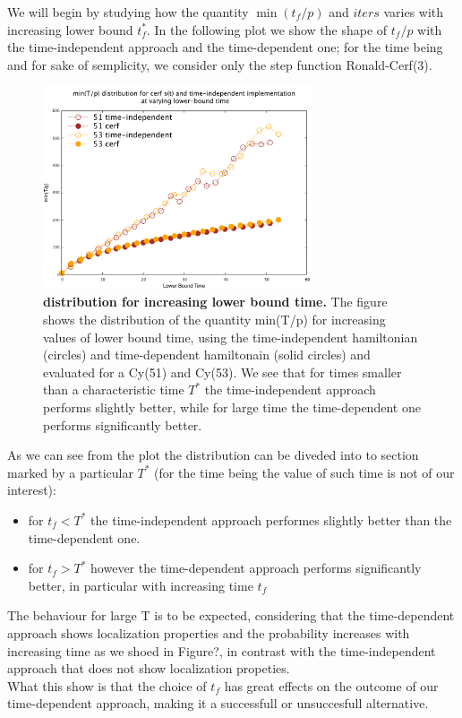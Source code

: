          We will begin by studying how the quantity $\min(t_f/p)$ and $iters$ varies with increasing lower bound $t_f^*$.
         In the following plot we show the shape of $t_f/p$ with the time-independent approach and the time-dependent one; for the time being and for sake of semplicity, we consider only the step function Ronald-Cerf(3).
         \begin{figure}[h]
         \centering
         \includegraphics[width=80mm]{./figures/min_tp/delta.pdf}
         \caption[$\min(t_f/P)$ distribution for increasing lower bound time.]{\textbf{ distribution for increasing lower bound time. }The figure shows the distribution of the quantity min(T/p) for increasing values of lower bound time, using the time-independent hamiltonian (circles) and time-dependent hamiltonain (solid circles) and evaluated for a Cy(51) and Cy(53). We see that for times smaller than a characteristic time $T^*$ the time-independent approach performs slightly better, while for large time the time-dependent one performs significantly better. }
         \label{fig:delta_increasing_time}
         \end{figure}
        As we can see from the plot the distribution can be diveded into to section marked by a particular $T^*$ (for the time being the value of such time is not of our interest):
        \begin{itemize}
            \item for $t_f<T^*$ the time-independent approach performes slightly better than the time-dependent one.
            \item for $t_f>T^*$ however the time-dependent approach performs significantly better, in particular with increasing time $t_f$
        \end{itemize}
        The behaviour for large T is to be expected, considering that the time-dependent approach shows localization properties and the probability increases with increasing time as we shoed in Figure?, in contrast with the time-independent approach that does not show localization propeties.\\ What this show is that the choice of $t_f$ has great effects on the outcome of our time-dependent approach, making it a successfull or unsuccesfull alternative.
